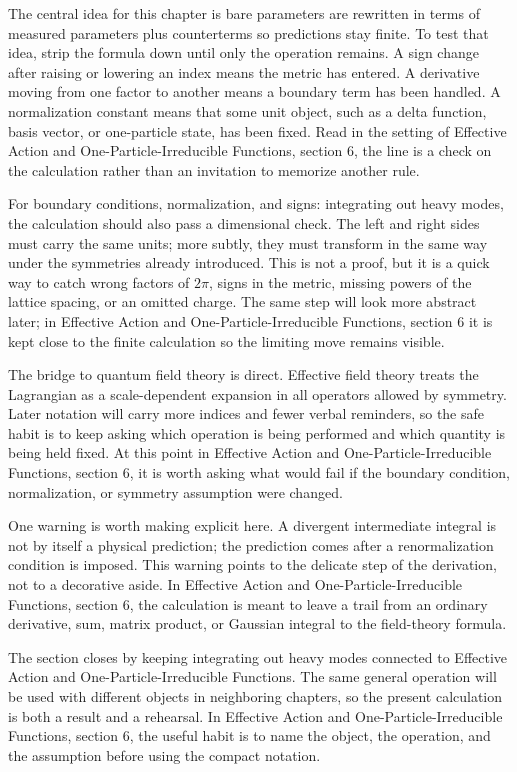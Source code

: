 The central idea for this chapter is bare parameters are rewritten in terms of measured parameters plus counterterms so predictions stay finite.  To test that idea, strip the formula down until only the operation remains.  A sign change after raising or lowering an index means the metric has entered.  A derivative moving from one factor to another means a boundary term has been handled.  A normalization constant means that some unit object, such as a delta function, basis vector, or one-particle state, has been fixed.  Read in the setting of Effective Action and One-Particle-Irreducible Functions, section 6, the line is a check on the calculation rather than an invitation to memorize another rule.

For boundary conditions, normalization, and signs: integrating out heavy modes, the calculation should also pass a dimensional check.  The left and right sides must carry the same units; more subtly, they must transform in the same way under the symmetries already introduced.  This is not a proof, but it is a quick way to catch wrong factors of \(2\pi\), signs in the metric, missing powers of the lattice spacing, or an omitted charge.  The same step will look more abstract later; in Effective Action and One-Particle-Irreducible Functions, section 6 it is kept close to the finite calculation so the limiting move remains visible.

The bridge to quantum field theory is direct.  Effective field theory treats the Lagrangian as a scale-dependent expansion in all operators allowed by symmetry.  Later notation will carry more indices and fewer verbal reminders, so the safe habit is to keep asking which operation is being performed and which quantity is being held fixed.  At this point in Effective Action and One-Particle-Irreducible Functions, section 6, it is worth asking what would fail if the boundary condition, normalization, or symmetry assumption were changed.

One warning is worth making explicit here.  A divergent intermediate integral is not by itself a physical prediction; the prediction comes after a renormalization condition is imposed.  This warning points to the delicate step of the derivation, not to a decorative aside.  In Effective Action and One-Particle-Irreducible Functions, section 6, the calculation is meant to leave a trail from an ordinary derivative, sum, matrix product, or Gaussian integral to the field-theory formula.

The section closes by keeping integrating out heavy modes connected to Effective Action and One-Particle-Irreducible Functions.  The same general operation will be used with different objects in neighboring chapters, so the present calculation is both a result and a rehearsal.  In Effective Action and One-Particle-Irreducible Functions, section 6, the useful habit is to name the object, the operation, and the assumption before using the compact notation.



